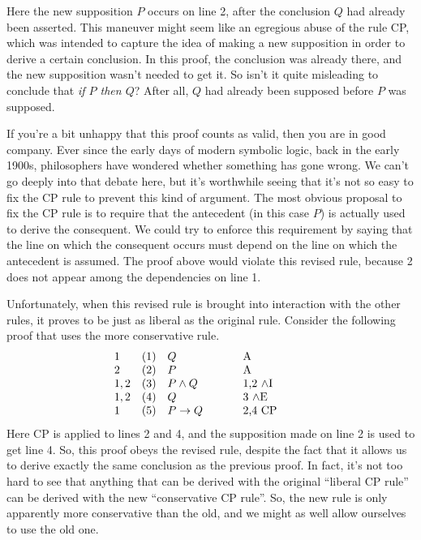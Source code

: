 Here the new supposition $P$ occurs on line 2, after the conclusion
$Q$ had already been asserted.  This maneuver might seem like an
egregious abuse of the rule CP, which was intended to capture the idea
of making a new supposition in order to derive a certain conclusion.
In this proof, the conclusion was already there, and the new
supposition wasn't needed to get it.  So isn't it quite misleading to
conclude that {\it if $P$ then $Q$}?  After all, $Q$ had already been
supposed before $P$ was supposed.

If you're a bit unhappy that this proof counts as valid, then you are
in good company.  Ever since the early days of modern symbolic logic,
back in the early 1900s, philosophers have wondered whether something
has gone wrong.  We can't go deeply into that debate here, but it's
worthwhile seeing that it's not so easy to fix the CP rule to prevent
this kind of argument.  The most obvious proposal to fix the CP rule
is to require that the antecedent (in this case $P$) is actually used
to derive the consequent.  We could try to enforce this requirement by
saying that the line on which the consequent occurs must depend on the
line on which the antecedent is assumed.  The proof above would
violate this revised rule, because 2 does not appear among the
dependencies on line 1.

Unfortunately, when this revised rule is brought into interaction with
the other rules, it proves to be just as liberal as the original rule.
Consider the following proof that uses the more conservative rule.
\[ \begin{array}{l l >{$}p{2cm}<{$} p{2cm}}
     1 & (1) & Q & A \\
     2 & (2) & P & A \\
     1,2 & (3) & P\wedge Q & 1,2 $\wedge$I \\
     1,2 & (4) & Q & 3 $\wedge$E \\
     1 & (5) & P\to Q & 2,4 CP \end{array} \] Here CP is applied to
lines 2 and 4, and the supposition made on line 2 is used to get line 4.  So, this proof obeys the revised rule, despite the fact that it allows us to derive exactly the same conclusion as the previous proof.  In fact, it's not too hard to see that anything that can be derived with the original ``liberal CP rule'' can be derived with the new ``conservative CP rule''.  So, the new rule is only apparently more conservative than the old, and we might as well allow ourselves to use the old one.


